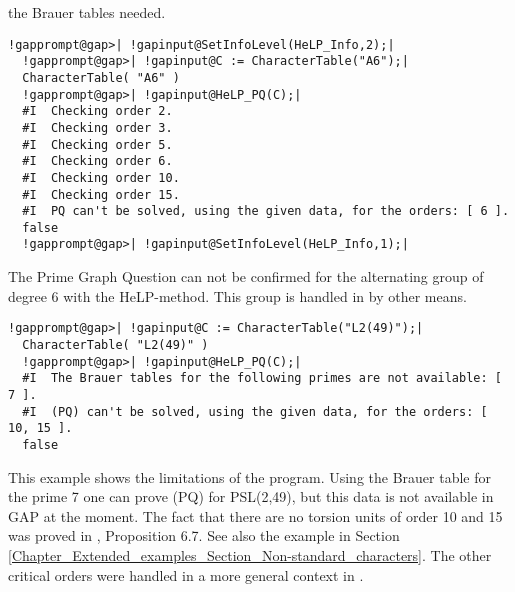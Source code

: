 \documentclass[a4paper,11pt]{report}
\begin{document}
{{the Brauer tables needed. 
\begin{Verbatim}[commandchars=!@|,fontsize=\small,frame=single,label=Example]
  !gapprompt@gap>| !gapinput@SetInfoLevel(HeLP_Info,2);|
  !gapprompt@gap>| !gapinput@C := CharacterTable("A6");|
  CharacterTable( "A6" )
  !gapprompt@gap>| !gapinput@HeLP_PQ(C);|
  #I  Checking order 2.
  #I  Checking order 3.
  #I  Checking order 5.
  #I  Checking order 6.
  #I  Checking order 10.
  #I  Checking order 15.
  #I  PQ can't be solved, using the given data, for the orders: [ 6 ].
  false
  !gapprompt@gap>| !gapinput@SetInfoLevel(HeLP_Info,1);|
\end{Verbatim}
 The Prime Graph Question can not be confirmed for the alternating group of
degree 6 with the HeLP-method. This group is handled in \cite{HerA6} by other means. 
\begin{Verbatim}[commandchars=!@|,fontsize=\small,frame=single,label=Example]
  !gapprompt@gap>| !gapinput@C := CharacterTable("L2(49)");|
  CharacterTable( "L2(49)" )
  !gapprompt@gap>| !gapinput@HeLP_PQ(C);|
  #I  The Brauer tables for the following primes are not available: [ 7 ].
  #I  (PQ) can't be solved, using the given data, for the orders: [ 10, 15 ].
  false
\end{Verbatim}
 This example shows the limitations of the program. Using the Brauer table for
the prime 7 one can prove (PQ) for PSL(2,49), but this data is not available
in GAP at the moment. The fact that there are no torsion units of order 10 and
15 was proved in \cite{HertweckBrauer}, Proposition 6.7. See also the example in Section \ref{Chapter_Extended_examples_Section_Non-standard_characters}. The other critical orders were handled in a more general context in \cite{BaMa4prI}. }

 }

   
\end{document}
